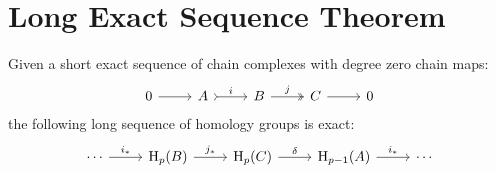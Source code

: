 \section{Long Exact Sequence Theorem}

\begin{theorem}
    \label{thm:long-exact-sequence}
    Given a short exact sequence of chain complexes with degree zero chain maps:
    \[
        \begin{tikzcd}
            0 \ar[r]
            &A \ar[r, tail, "i"]
            &B \ar[r, two heads, "j"]
            &C \ar[r]
            &0
        \end{tikzcd}
    \]
    the following long sequence of homology groups is exact:
    \[
        \begin{tikzcd}
            \cdots \ar[r, "i_{*}"]
            &\Hmlg_p(B) \ar[r, "j_{*}"]
            &\Hmlg_p(C) \ar[r, "\delta"]
            &\Hmlg_{p-1}(A) \ar[r, "i_{*}"]
            &\cdots
        \end{tikzcd}
    \]
\end{theorem}

